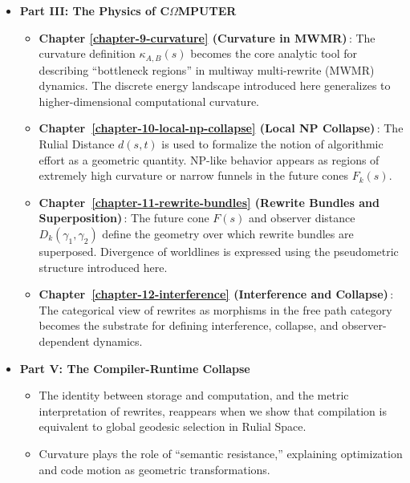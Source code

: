 \begin{itemize}

\item \textbf{Part III: The Physics of C{\Large$\Omega$}MPUTER}  
      \begin{itemize}
          \item \textbf{Chapter \ref{chapter-9-curvature} (Curvature in MWMR)}\,:  
                The curvature definition $\kappa_{A,B}(s)$ becomes the core analytic tool for 
                describing “bottleneck regions” in multiway multi-rewrite (MWMR) dynamics.  
                The discrete energy landscape introduced here generalizes to higher-dimensional
                computational curvature.

         \item \textbf{Chapter~\ref{chapter-10-local-np-collapse} (Local NP Collapse)}\,:  
                The Rulial Distance $d(s,t)$ is used to formalize the notion of algorithmic 
                effort as a geometric quantity. NP-like behavior appears as regions of extremely 
                high curvature or narrow funnels in the future cones $F_k(s)$.

         \item \textbf{Chapter~\ref{chapter-11-rewrite-bundles} (Rewrite Bundles and Superposition)}\,:  
                The future cone $F(s)$ and observer distance $D_k(\gamma_1,\gamma_2)$ define the 
                geometry over which rewrite bundles are superposed. Divergence of worldlines is 
                expressed using the pseudometric structure introduced here.

         \item \textbf{Chapter~\ref{chapter-12-interference} (Interference and Collapse)}\,:  
                The categorical view of rewrites as morphisms in the free path category becomes 
                the substrate for defining interference, collapse, and observer-dependent dynamics.
      \end{itemize}

\item \textbf{Part V: The Compiler-Runtime Collapse}  
      \begin{itemize}
          \item The identity between storage and computation, and the metric interpretation 
                of rewrites, reappears when we show that compilation is equivalent to global 
                geodesic selection in Rulial Space.

          \item Curvature plays the role of “semantic resistance,” explaining optimization and 
                code motion as geometric transformations.
      \end{itemize}


\end{itemize}
